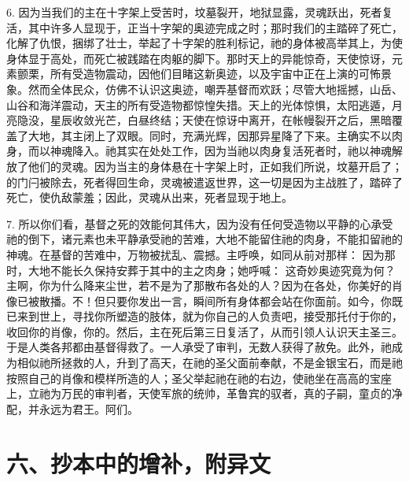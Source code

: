 6. 因为当我们的主在十字架上受苦时，坟墓裂开，地狱显露，灵魂跃出，死者复活，其中许多人显现于，正当十字架的奥迹完成之时；那时我们的主踏碎了死亡，化解了仇恨，捆绑了壮士，举起了十字架的胜利标记，祂的身体被高举其上，为使身体显于高处，而死亡被践踏在肉躯的脚下。那时天上的异能惊奇，天使惊讶，元素颤栗，所有受造物震动，因他们目睹这新奥迹，以及宇宙中正在上演的可怖景象。然而全体民众，仿佛不认识这奥迹，嘲弄基督而欢跃；尽管大地摇撼，山岳、山谷和海洋震动，天主的所有受造物都惊惶失措。天上的光体惊惧，太阳逃遁，月亮隐没，星辰收敛光芒，白昼终结；天使在惊讶中离开，在帐幔裂开之后，黑暗覆盖了大地，其主闭上了双眼。同时，充满光辉，因那异星降了下来。主确实不以肉身，而以神魂降入。祂其实在处处工作，因为当祂以肉身复活死者时，祂以神魂解放了他们的灵魂。因为当主的身体悬在十字架上时，正如我们所说，坟墓开启了；的门闩被除去，死者得回生命，灵魂被遣返世界，这一切是因为主战胜了，踏碎了死亡，使仇敌蒙羞；因此，灵魂从出来，死者显现于地上。\par

7. 所以你们看，基督之死的效能何其伟大，因为没有任何受造物以平静的心承受祂的倒下，诸元素也未平静承受祂的苦难，大地不能留住祂的肉身，不能扣留祂的神魂。在基督的苦难中，万物被扰乱、震撼。主呼唤，如同从前对那样： 因为那时，大地不能长久保持安葬于其中的主之肉身；她呼喊： 这奇妙奥迹究竟为何？主啊，你为什么降来尘世，若不是为了那散布各处的人？因为在各处，你美好的肖像已被散播。不！但只要你发出一言，瞬间所有身体都会站在你面前。如今，你既已来到世上，寻找你所塑造的肢体，就为你自己的人负责吧，接受那托付于你的，收回你的肖像，你的。然后，主在死后第三日复活了，从而引领人认识天主圣三。于是人类各邦都由基督得救了。一人承受了审判，无数人获得了赦免。此外，祂成为相似祂所拯救的人，升到了高天，在祂的圣父面前奉献，不是金银宝石，而是祂按照自己的肖像和模样所造的人；圣父举起祂在祂的右边，使祂坐在高高的宝座上，立祂为万民的审判者，天使军旅的统帅，革鲁宾的驭者，真的子嗣，童贞的净配，并永远为君王。阿们。\par


\section{六、抄本中的增补，附异文}

